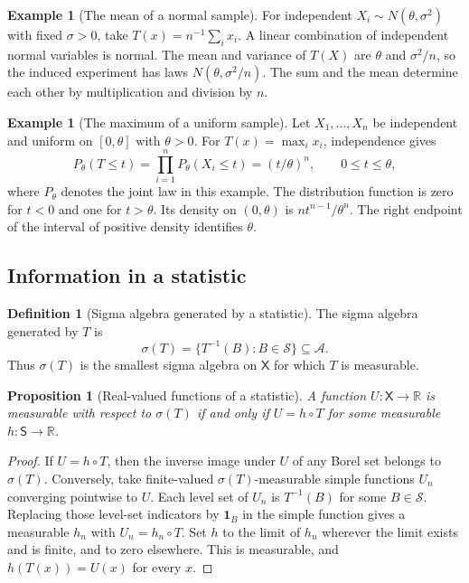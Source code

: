 \documentclass[11pt,oneside]{book}
\newtheorem{proposition}[theorem]{Proposition}
\theoremstyle{definition}
\newtheorem{definition}[theorem]{Definition}
\newtheorem{example}[theorem]{Example}
\theoremstyle{remark}
\newcommand{\R}{\mathbb R}
\begin{document}
\begin{example}[The mean of a normal sample]
\label{ex:statistic-normal-mean}
For independent $X_i\sim N(\theta,\sigma^2)$ with fixed $\sigma>0$,
take $T(x)=n^{-1}\sum_i x_i$. A linear combination of independent
normal variables is normal. The mean and variance of $T(X)$
are $\theta$ and $\sigma^2/n$, so the induced experiment has
laws $N(\theta,\sigma^2/n)$. The sum and the mean determine
each other by multiplication and division by $n$.
\end{example}

\begin{example}[The maximum of a uniform sample]
\label{ex:statistic-uniform-maximum}
Let $X_1,\ldots,X_n$ be independent and uniform on $[0,\theta]$
with $\theta>0$. For $T(x)=\max_i x_i$, independence gives
\[
P_\theta(T\leq t)=\prod_{i=1}^n P_\theta(X_i\leq t)
=(t/\theta)^n,\qquad 0\leq t\leq\theta,
\]
where $P_\theta$ denotes the joint law in this example.
The distribution function is zero for $t<0$ and one for
$t>\theta$. Its density on $(0,\theta)$ is
$nt^{n-1}/\theta^n$. The right endpoint of the interval of
positive density identifies $\theta$.
\end{example}

\subsection{Information in a statistic}
\label{subsec:information-in-a-statistic}

\begin{definition}[Sigma algebra generated by a statistic]
\label{def:statistic-sigma-algebra}
The sigma algebra generated by $T$ is
\[
\sigma(T)=\{T^{-1}(B):B\in\mathcal S\}\subseteq\mathcal A .
\]
Thus $\sigma(T)$ is the smallest sigma algebra on $\mathsf X$
for which $T$ is measurable.
\end{definition}

\begin{proposition}[Real-valued functions of a statistic]
\label{prop:real-statistic-factorization}
A function $U:\mathsf X\to\R$ is measurable with respect to
$\sigma(T)$ if and only if $U=h\circ T$ for some measurable
$h:\mathsf S\to\R$.
\end{proposition}
\begin{proof}
If $U=h\circ T$, then the inverse image under $U$ of any Borel
set belongs to $\sigma(T)$. Conversely, take finite-valued
$\sigma(T)$-measurable simple functions $U_n$ converging pointwise
to $U$. Each level set of $U_n$ is $T^{-1}(B)$ for some
$B\in\mathcal S$. Replacing those level-set indicators by
$\mathbf 1_B$ in the simple function gives a measurable $h_n$
with $U_n=h_n\circ T$. Set $h$ to the limit of $h_n$ wherever
the limit exists and is finite, and to zero elsewhere. This is
measurable, and $h(T(x))=U(x)$ for every $x$.
\end{proof}
\end{document}
